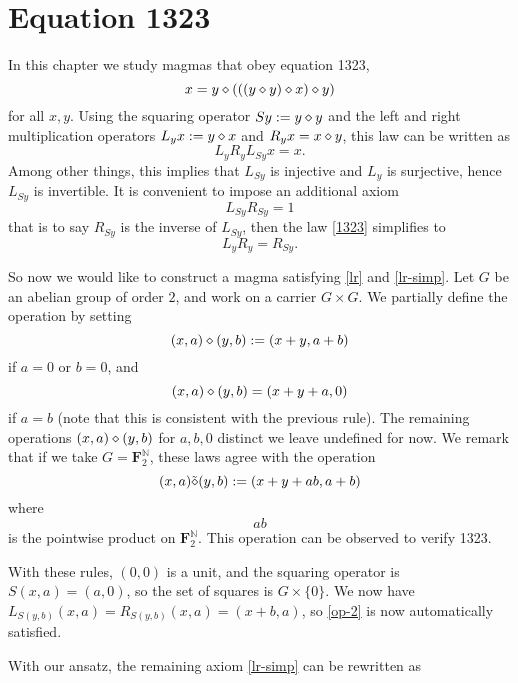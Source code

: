 \chapter{Equation 1323}\label{1323-chapter}

In this chapter we study magmas that obey equation 1323,
\begin{equation}\label{1323}
  x = y \diamond (((y \diamond y) \diamond x) \diamond y)
\end{equation}
for all $x,y$.  Using the squaring operator $Sy := y \diamond y$ and the left and right multiplication operators $L_y x := y \diamond x$ and $R_y x = x \diamond y$, this law can be written as
$$ L_y R_y L_{Sy} x = x.$$
Among other things, this implies that $L_{Sy}$ is injective and $L_y$ is surjective, hence $L_{Sy}$ is invertible.  It is convenient to impose an additional axiom
\begin{equation}\label{lr}
 L_{Sy} R_{Sy} = 1
\end{equation}
that is to say $R_{Sy}$ is the inverse of $L_{Sy}$, then the law \eqref{1323} simplifies to
\begin{equation}\label{lr-simp}
  L_{y} R_{y} = R_{Sy}.
 \end{equation}

 So now we would like to construct a magma satisfying \eqref{lr} and \eqref{lr-simp}.  Let $G$ be an abelian group of order $2$, and work on a carrier $G \times G$.  We partially define the operation by setting
\begin{equation}\label{op-1}
 (x,a) \diamond (y,b) := (x+y, a+b)
\end{equation}
if $a=0$ or $b=0$, and
\begin{equation}\label{op-2}
  (x,a) \diamond (y,b) = (x+y+a, 0)
\end{equation}
if $a=b$ (note that this is consistent with the previous rule).   The remaining operations $(x,a) \diamond (y,b)$ for $a,b,0$ distinct we leave undefined for now.  We remark that if we take $G = {\mathbf F}_2^{\mathbb N}$, these laws agree with the operation
$$ (x,a) \tilde {\diamond} (y,b) := (x+y+ab, a+b)$$
where $$ab$$ is the pointwise product on ${\mathbf F}_2^{\mathbb N}$. This operation can be observed to verify 1323.

With these rules, $(0,0)$ is a unit, and the squaring operator is $S(x,a) = (a,0)$, so the set of squares is $G \times \{0\}$.  We now have $L_{S(y,b)} (x,a) = R_{S(y,b)} (x,a) = (x+b, a)$, so \eqref{op-2} is now automatically satisfied.

With our ansatz, the remaining axiom \eqref{lr-simp} can be rewritten as

